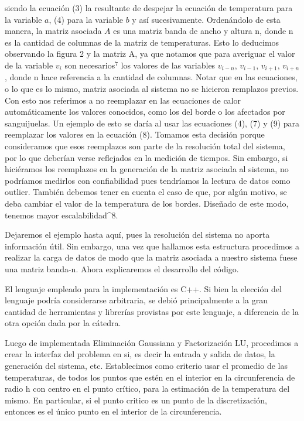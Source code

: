 siendo la ecuación (3) la resultante de despejar la ecuación de temperatura para la variable $a$, (4) para la variable $b$ y así sucesivamente.
Ordenándolo de esta manera, la matriz asociada $A$ es una matriz banda de ancho y altura n, donde n es la cantidad de columnas 
de la matriz de temperaturas. Esto lo deducimos observando la figura 2 y la matriz A,
ya que notamos que para averiguar el valor de la variable $v_{i}$ son necesarios$^7$ los valores de las variables $v_{i-n}$, $v_{i-1}$, 
$v_{i+1}$, $v_{i+n}$, donde n hace referencia a la cantidad de columnas.
Notar que en las ecuaciones, o lo que es lo mismo, matriz asociada al sistema no se hicieron remplazos previos. Con esto nos referimos a no reemplazar
 en las ecuaciones de calor automáticamente los valores conocidos, como los del borde o los afectados por sanguijuelas. Un ejemplo de esto se daría 
 al usar las ecuaciones (4), (7) y (9) para reemplazar los valores en la ecuación (8). Tomamos esta decisión porque consideramos que esos reemplazos son parte
 de la resolución total del sistema, por lo que deberían verse reflejados en la medición de tiempos. Sin embargo, si hiciéramos los reemplazos 
 en la generación de la matriz asociada al sistema, no podríamos medirlos con confiabilidad pues tendríamos la lectura de datos como outlier. También debemos tener en cuenta el caso de que, por algún motivo, se deba cambiar el valor de la temperatura de los bordes. Dise\~nado de este modo, tenemos mayor escalabilidad^8. 

Dejaremos el ejemplo hasta aquí, pues la resolución del sistema no aporta información útil. Sin embargo, una vez que hallamos esta estructura 
procedimos a realizar la carga de datos de modo que la matriz asociada a nuestro sistema fuese una matriz banda-n. Ahora explicaremos el desarrollo del código.

El lenguaje empleado para la implementación es C++. Si bien la elección del lenguaje podría considerarse arbitraria, se debió principalmente a la gran
cantidad de herramientas y librerías provistas por este lenguaje, a diferencia de la otra opción dada por la cátedra. 


Luego de implementada Eliminación Gaussiana y Factorizaci\'on LU, procedimos a crear la interfaz del problema en si, es decir la entrada y salida de datos, la generación
del sistema, etc. Establecimos como criterio usar el promedio de las temperaturas, de todos los puntos que estén
en el interior en la circunferencia de radio h con centro en el punto crítico,
para la estimación de la temperatura del mismo. En particular, si el punto critico es un punto de la discretizaci\'on, entonces es el único punto en el interior de la circunferencia.

